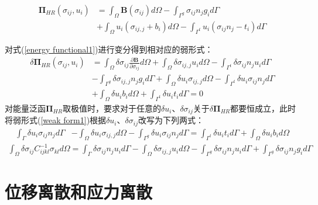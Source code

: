 \begin{equation}\label{energy functional1}
\begin{split}
    \pmb{\Pi}_{H\!R}(\sigma_{ij},u_i)&=\int_{\Omega}\pmb{B}(\sigma_{ij})d\Omega-\int_{\Gamma^g}\sigma_{ij}n_jg_id\Gamma\\
    &+\int_{\Omega}u_i(\sigma_{ij,j}+b_i)d\Omega-\int_{\Gamma^t}u_i(\sigma_{ij}n_j-t_i)d\Gamma
\end{split}
\end{equation}\par
对式(\ref{energy functional1})进行变分得到相对应的弱形式：
\begin{equation}\label{weak form1}
\begin{split} 
    \delta\pmb{\Pi}_{H\!R}(\sigma_{ij},u_i)&=\int_{\Omega}\delta\sigma_{ij}\frac{\partial\pmb{B}}{\partial \sigma_{ij}}d\Omega+\int_{\Omega}\delta\sigma_{ij,j}u_id\Omega-\int_{\Gamma^t}\delta\sigma_{ij}n_ju_id\Gamma\\
    &-\int_{\Gamma^g}\delta\sigma_{ij,j}n_jg_id\Gamma+\int_{\Omega}\delta u_i\sigma_{ij,j}d\Omega- \int_{\Gamma^t}\delta u_i\sigma_{ij}n_jd\Gamma\\
    &+\int_{\Omega}\delta u_ib_id\Omega+\int_{\Gamma^t}\delta u_it_id\Gamma=0
\end{split}
\end{equation}
对能量泛函$\pmb{\Pi}_{H\!R}$取极值时，要求对于任意的$\delta u_i$、$\delta\sigma_{ij}$关于$\delta\pmb{\Pi}_{H\!R}$都要恒成立，此时将弱形式(\ref{weak form1})根据$\delta u_i$、$\delta\sigma_{ij}$改写为下列两式：
\begin{equation}\label{deltau}
\begin{split}
    \int_{\Gamma}\delta u_i\sigma_{ij}n_jd\Gamma&-\int_{\Omega}\delta u_i\sigma_{ij,j}d\Omega-\int_{\Gamma^g}\delta u_i\sigma_{ij}n_jd\Gamma
    =\int_{\Gamma^t}\delta u_it_id\Gamma+\int_{\Omega}\delta u_ib_id\Omega
\end{split}
\end{equation} 
\begin{equation}\label{deltasigma}
\begin{split}
    \int_{\Omega}\delta\sigma_{ij}C^{-1}_{ijkl}\sigma_{kl}d\Omega=\int_{\Gamma}\delta\sigma_{ij}n_ju_id\Gamma-\int_{\Omega}\delta\sigma_{ij,j}u_id\Omega
    -\int_{\Gamma^g}\delta\sigma_{ij}n_ju_id\Gamma+\int_{\Gamma^g}\delta\sigma_{ij}n_jg_id\Gamma
\end{split}
\end{equation}    
\section{位移离散和应力离散}
